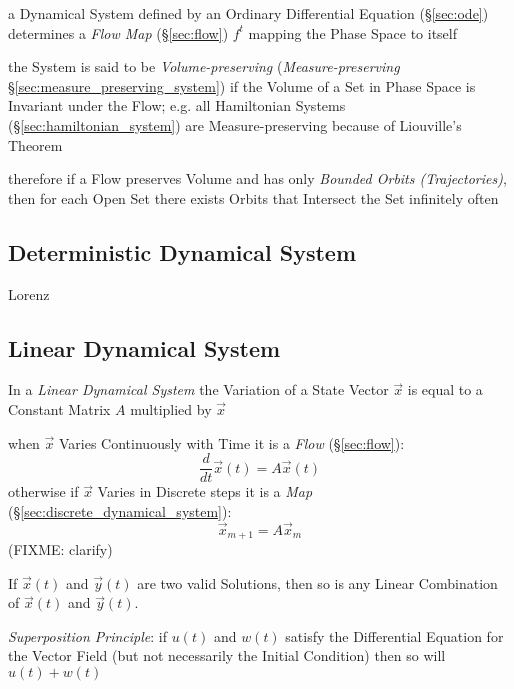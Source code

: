 a Dynamical System defined by an Ordinary Differential Equation
(\S\ref{sec:ode}) determines a \emph{Flow Map} (\S\ref{sec:flow}) $f^t$ mapping
the Phase Space to itself

the System is said to be \emph{Volume-preserving} (\emph{Measure-preserving}
\S\ref{sec:measure_preserving_system}) if the Volume of a Set in Phase Space is
Invariant under the Flow;
e.g. all Hamiltonian Systems (\S\ref{sec:hamiltonian_system}) are
Measure-preserving because of Liouville's Theorem

therefore if a Flow preserves Volume and has only \emph{Bounded Orbits
  (Trajectories)}, then for each Open Set there exists Orbits that Intersect
the Set infinitely often



\subsection{Deterministic Dynamical System}
\label{sec:deterministic_dynamical_system}

Lorenz



\subsection{Linear Dynamical System}\label{sec:linear_dynamical_system}

In a \emph{Linear Dynamical System} the Variation of a State Vector $\vec{x}$
is equal to a Constant Matrix $A$ multiplied by $\vec{x}$

when $\vec{x}$ Varies Continuously with Time it is a \emph{Flow}
(\S\ref{sec:flow}):
\[
  \frac{d}{dt}\vec{x}(t) = A\vec{x}(t)
\]
otherwise if $\vec{x}$ Varies in Discrete steps it is a \emph{Map}
(\S\ref{sec:discrete_dynamical_system}):
\[
  \vec{x}_{m+1} = A\vec{x}_m
\]
(FIXME: clarify)

If $\vec{x}(t)$ and $\vec{y}(t)$ are two valid Solutions, then so is any Linear
Combination of $\vec{x}(t)$ and $\vec{y}(t)$.

\emph{Superposition Principle}: if $u(t)$ and $w(t)$ satisfy the Differential
Equation for the Vector Field (but not necessarily the Initial Condition) then
so will $u(t) + w(t)$

